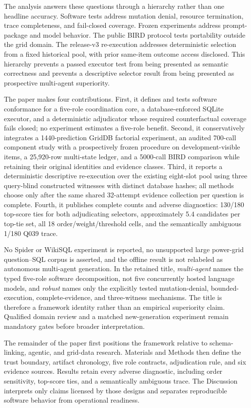 \documentclass[applsci,article,submit,moreauthors]{Definitions/mdpi}
\begin{document}
The analysis answers these questions through a hierarchy rather than one headline accuracy. Software tests address mutation denial, resource termination, trace completeness, and fail-closed coverage. Frozen experiments address prompt-package and model behavior. The public BIRD protocol tests portability outside the grid domain. The release-v3 re-execution addresses deterministic selection from a fixed historical pool, with prior same-item outcome access disclosed. This hierarchy prevents a passed executor test from being presented as semantic correctness and prevents a descriptive selector result from being presented as prospective multi-agent superiority.

The paper makes four contributions. First, it defines and tests software conformance for a five-role coordination core, a database-enforced SQLite executor, and a deterministic adjudicator whose required counterfactual coverage fails closed; no experiment estimates a five-role benefit. Second, it conservatively integrates a 1440-prediction GridDB factorial experiment, an audited 700-call component study with a prospectively frozen procedure on development-visible items, a 25,920-row multi-state ledger, and a 5000-call BIRD comparison while retaining their original identities and evidence classes. Third, it reports a deterministic descriptive re-execution over the existing eight-slot pool using three query-blind constructed witnesses with distinct database hashes; all methods choose only after the same shared 32-attempt evidence collection per question is complete. Fourth, it publishes complete counts and adverse diagnostics: 130/180 top-score ties for both adjudicating selectors, approximately 5.4 candidates per top-tie set, all 18 order/weight/threshold cells, and the semantically ambiguous 1/180 Q039 trace.

No Spider or WikiSQL experiment is reported, no unsupported large power-grid question--SQL corpus is asserted, and the offline result is not relabeled as autonomous multi-agent generation. In the retained title, \emph{multi-agent} names the typed five-role software decomposition, not five concurrently hosted language models, and \emph{robust} names only the explicitly tested mutation-denial, bounded-execution, complete-evidence, and three-witness mechanisms. The title is therefore a framework identity rather than an empirical superiority claim. Qualified domain review and a matched new-generation experiment remain mandatory gates before broader interpretation.

The remainder of the paper first positions the framework relative to schema-linking, agentic, and grid-data research. Materials and Methods then define the trust boundary, artifact chronology, five role contracts, adjudication rule, and six evidence sources. Results retain every adverse diagnostic, including order sensitivity, top-score ties, and a semantically ambiguous trace. The Discussion interprets only claims licensed by those designs and separates reproducible software behavior from operational readiness.
\end{document}
